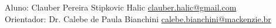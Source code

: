 \documentclass[12pt,a4paper]{article}
\begin{document}
\newpage

\section*{}
Aluno: Clauber Pereira Stipkovic Halic \url{clauber.halic@gmail.com} \\
Orientador: Dr. Calebe de Paula Bianchini \url{calebe.bianchini@mackenzie.br}

\section*{}
\listoffigures
\listoftables

\newpage
\section*{}
\tableofcontents
\end{document}
